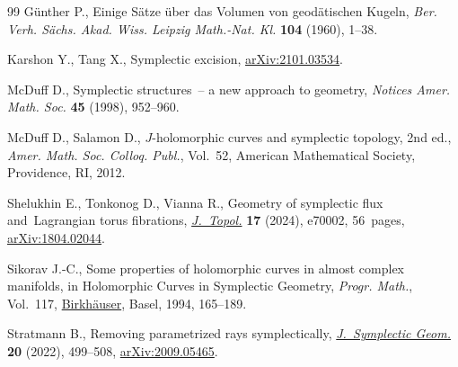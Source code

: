 \documentclass[10pt,a4paper]{amsart}
\numberwithin{equation}{section}
\theoremstyle{definition}
\begin{document}
\begin{thebibliography}{99}
G{\"u}nther P., Einige S{\"a}tze {\"u}ber das {V}olumen von geod{\"a}tischen
 {K}ugeln, \textit{Ber. Verh. S{\"a}chs. Akad. Wiss. Leipzig Math.-Nat. Kl.}
 \textbf{104} (1960), 1--38.

Karshon Y., Tang X., Symplectic excision,
 \href{http://arxiv.org/abs/2101.03534}{arXiv:2101.03534}.

McDuff D., Symplectic structures~-- a new approach to geometry, \textit{Notices
 Amer. Math. Soc.} \textbf{45} (1998), 952--960.

McDuff D., Salamon D., {$J$}-holomorphic curves and symplectic topology, 2nd ed.,
 \textit{Amer. Math. Soc. Colloq. Publ.}, Vol.~52, American
 Mathematical Society, Providence, RI, 2012.

Shelukhin E., Tonkonog D., Vianna R., Geometry of symplectic flux
 and~{L}agrangian torus fibrations,
 \href{https://doi.org/10.1112/topo.70002}{\textit{J.~Topol.}} \textbf{17}
 (2024), e70002, 56~pages,
 \href{http://arxiv.org/abs/1804.02044}{arXiv:1804.02044}.

Sikorav J.-C., Some properties of holomorphic curves in almost complex
 manifolds, in Holomorphic {C}urves in {S}ymplectic {G}eometry, \textit{Progr.
 Math.}, Vol.~117,
 \href{https://doi.org/10.1007/978-3-0348-8508-9_6}{Birkh\"auser}, Basel,
 1994, 165--189.

Stratmann B., Removing parametrized rays symplectically,
 \href{https://doi.org/10.4310/jsg.2022.v20.n2.a4}{\textit{J.~Symplectic
 Geom.}} \textbf{20} (2022), 499--508,
 \href{http://arxiv.org/abs/2009.05465}{arXiv:2009.05465}.

\end{thebibliography}
\end{document}
